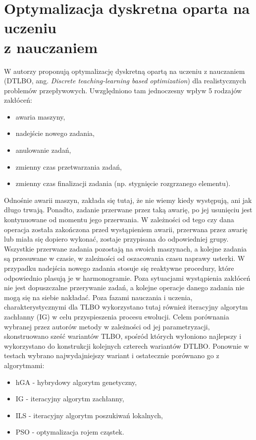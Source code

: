 \documentclass[printmode,oneside]{mgr}
\begin{document}
\section[Optymalizacja dyskretna oparta na uczeniu z nauczaniem]{Optymalizacja dyskretna oparta na uczeniu\\ z nauczaniem}
W \cite{DTLBO} autorzy proponują optymalizację dyskretną opartą na uczeniu z nauczaniem (\mbox{DTLBO}, ang. \emph{Discrete teaching-learning based optimization}) dla realistycznych problemów przepływowych. Uwzględniono tam jednoczesny wpływ 5 rodzajów zakłóceń:
\begin{itemize}
    \item awaria maszyny,
    \item nadejście nowego zadania,
    \item anulowanie zadań,
    \item zmienny czas przetwarzania zadań,
    \item zmienny czas finalizacji zadania (np. stygnięcie rozgrzanego elementu).
\end{itemize}
Odnośnie awarii maszyn, zakłada się tutaj, że nie wiemy kiedy występują, ani jak długo trwają. Ponadto, zadanie przerwane przez taką awarię, po jej usunięciu jest kontynuowane od momentu jego przerwania. W zależności od tego czy dana operacja została zakończona przed wystąpieniem awarii, przerwana przez awarię lub miała się dopiero wykonać, zostaje przypisana do odpowiedniej grupy. Wszystkie przerwane zadania pozostają na swoich maszynach, a  kolejne zadania są przesuwane w czasie, w zależności od oszacowania czasu naprawy usterki. W przypadku nadejścia nowego zadania stosuje się reaktywne procedury, które odpowiednio plasują je w harmonogramie. Poza sytuacjami wystąpienia zakłóceń nie jest dopuszczalne przerywanie zadań, a kolejne operacje danego zadania nie mogą się na siebie nakładać. Poza fazami nauczania i uczenia, charakterystycznymi dla TLBO wykorzystano tutaj również iteracyjny algorytm zachłanny (IG) w celu przyspieszenia procesu ewolucji. Celem porównania wybranej przez autorów metody w zależności od jej parametryzacji, skonstruowano sześć wariantów TLBO, spośród których wyłoniono najlepszy i wykorzystano do konstrukcji kolejnych czterech wariantów DTLBO. Ponownie w testach wybrano najwydajniejszy wariant i ostatecznie porównano go z algorytmami:
\begin{itemize}
    \item hGA - hybrydowy algorytm genetyczny,
    \item IG - iteracyjny algorytm zachłanny,
    \item ILS - iteracyjny algorytm poszukiwań lokalnych,
    \item PSO - optymalizacja rojem cząstek.
\end{itemize}
\end{document}
